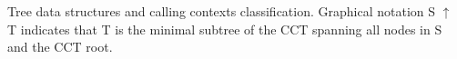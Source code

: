 \label{fig:hcct-venn} Tree data structures and calling contexts classification. Graphical notation S $\uparrow$ T indicates that T is the minimal subtree of the CCT spanning all nodes in S and the CCT root.
